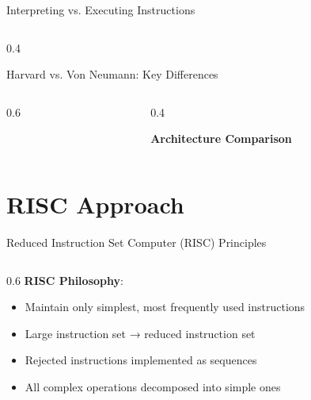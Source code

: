 \documentclass[aspectratio=169]{beamer}
\newcommand{\concept}[1]{\textbf{\color{darkblue}#1}}
\begin{document}
\begin{frame}{Interpreting vs. Executing Instructions}
\begin{columns}
\begin{column}{0.4\textwidth}
\begin{center}
\begin{frame}{Harvard vs. Von Neumann: Key Differences}
\begin{columns}
\begin{column}{0.6\textwidth}
\end{column}
\begin{column}{0.4\textwidth}
\begin{center}
\textbf{Architecture Comparison}
\vspace{0.3cm}

\end{center}
\end{column}
\end{columns}
\end{frame}

\section{RISC Approach}

\begin{frame}{Reduced Instruction Set Computer (RISC) Principles}
\begin{columns}
\begin{column}{0.6\textwidth}
\concept{RISC Philosophy}:
\begin{itemize}
\item Maintain only simplest, most frequently used instructions
\item Large instruction set → reduced instruction set
\item Rejected instructions implemented as sequences
\item All complex operations decomposed into simple ones
\end{itemize}


\end{column}
\end{columns}
\end{frame}
\end{center}
\end{column}
\end{columns}
\end{frame}
\end{document}
